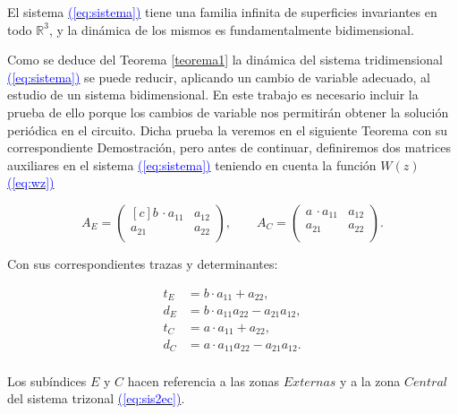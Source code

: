 \documentclass[12pt,a4paper]{report} %
\newcommand{\eref}[1]{\hyperref[#1]{\textcolor{blue}{(\ref*{#1})}}}
\begin{document}
		\vspace{0.5cm}\noindent El sistema \eref{eq:sistema} tiene una familia infinita de superficies invariantes en todo $\mathbb{R}^3$, y la dinámica de los mismos es fundamentalmente bidimensional.
	
	\newpage
	
	\vspace{0.5cm}Como se deduce del Teorema \ref{teorema1} la dinámica del sistema tridimensional \eref{eq:sistema} se puede reducir, aplicando un cambio de variable adecuado, al estudio de un sistema bidimensional. En este trabajo es necesario incluir la prueba de ello porque los cambios de variable nos permitirán obtener la solución periódica en el circuito. Dicha prueba la veremos en el siguiente Teorema con su correspondiente Demostración, pero antes de continuar, definiremos dos matrices auxiliares en el sistema \eref{eq:sistema} teniendo en cuenta la función $W(z)$ \eref{eq:wz}
	
	\begin{equation}
		A_E=\begin{pmatrix*}[c]
			b \, \cdotp a_{11} & a_{12}\\
			a_{21} & a_{22}\\
		\end{pmatrix*}, \qquad 	A_C=\begin{pmatrix*}
			a \, \cdotp a_{11} & a_{12}\\
			a_{21} & a_{22}\\
		\end{pmatrix*}.
	\end{equation}\smallskip
	
	\noindent Con sus correspondientes trazas y determinantes:
	
	\begin{equation}
		\begin{aligned}
			t_E &= b \cdot a_{11} + a_{22},\\
			d_E &= b \cdot a_{11}a_{22} - a_{21}a_{12},\\
			t_C &= a \cdot a_{11} + a_{22},\\
			d_C &= a \cdot a_{11}a_{22} - a_{21}a_{12}.\\
		\end{aligned}
	\end{equation}\smallskip
	
 \vspace{0.5cm}\noindent Los subíndices $E$ y $C$ hacen referencia a las zonas $Externas$ y a la zona $Central$ del sistema trizonal \eref{eq:sis2ec}.
	
\end{document}
